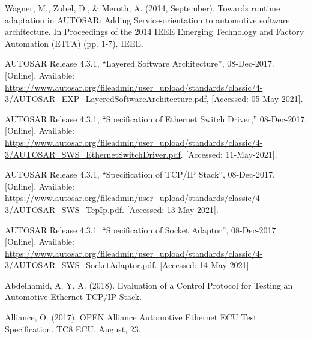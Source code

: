 \documentclass[a4paper, 12pt, oneside, BCOR1cm,toc=chapterentrywithdots]{scrbook}
\begin{document}
\begin{thebibliography}{00}
Wagner, M., Zobel, D., \& Meroth, A. (2014, September). Towards runtime adaptation in AUTOSAR: Adding Service-orientation to automotive software architecture. In Proceedings of the 2014 IEEE Emerging Technology and Factory Automation (ETFA) (pp. 1-7). IEEE.

 AUTOSAR Release 4.3.1, “Layered Software Architecture”, 08-Dec-2017. [Online]. Available: \url{https://www.autosar.org/fileadmin/user\_upload/standards/classic/4-3/AUTOSAR_EXP_LayeredSoftwareArchitecture.pdf}, [Accessed: 05-May-2021]. 

 AUTOSAR Release 4.3.1, “Specification of Ethernet Switch Driver,” 08-Dec-2017. [Online]. Available: \url{https://www.autosar.org/fileadmin/user_upload/standards/classic/4-3/AUTOSAR_SWS_EthernetSwitchDriver.pdf}. [Accessed: 11-May-2021].  

AUTOSAR Release 4.3.1, “Specification of TCP/IP Stack”, 08-Dec-2017. [Online]. Available: \url{https://www.autosar.org/fileadmin/user_upload/standards/classic/4-3/AUTOSAR_SWS_TcpIp.pdf}. [Accessed: 13-May-2021].

 AUTOSAR Release 4.3.1. “Specification of Socket Adaptor”, 08-Dec-2017. [Online]. Available: \url{https://www.autosar.org/fileadmin/user_upload/standards/classic/4-3/AUTOSAR_SWS_SocketAdaptor.pdf}. [Accessed: 14-May-2021].

Abdelhamid, A. Y. A. (2018). Evaluation of a Control Protocol for Testing an Automotive Ethernet TCP/IP Stack.

Alliance, O. (2017). OPEN Alliance Automotive Ethernet ECU Test Specification. TC8 ECU, August, 23.

\end{thebibliography}
\end{document}
